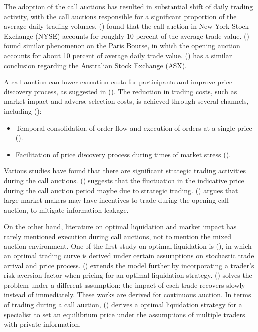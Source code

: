\documentclass{article}
\begin{document}
The adoption of the call auctions has resulted in substantial shift of daily trading activity, with the call auctions responsible for a significant proportion of the average daily trading volumes. (\cite{Madhavan2015}) found that the call auction in New York Stock Exchange (NYSE) accounts for roughly 10 percent of the average trade value. (\cite{Bruno1999}) found similar phenomenon on the Paris Bourse, in which the opening auction accounts for about 10 percent of average daily trade value. (\cite{Carole2006}) has a similar conclusion regarding the Australian Stock Exchange (ASX).

A call auction can lower execution costs for participants and improve price discovery process, as suggested in (\cite{Pagano2003}). The reduction in trading costs, such as market impact and adverse selection costs, is achieved through several channels, including (\cite{Carole2006}):

\begin{itemize}
  \item Temporal consolidation of order flow and execution of orders at a single price (\cite{Economides1995}).
  \item Facilitation of price discovery process during times of market stress (\cite{Madhavan1992}).
\end{itemize}

Various studies have found that there are significant strategic trading activities during the call auctions. (\cite{Bruno1999}) suggests that the fluctuation in the indicative price during the call auction period maybe due to strategic trading. (\cite{Vives2001}) argues that large market makers may have incentives to trade during the opening call auction, to mitigate information leakage.

On the other hand, literature on optimal liquidation and market impact has rarely mentioned execution during call auctions, not to mention the mixed auction environment. One of the first study on optimal liquidation is (\cite{HoStoll1981}), in which an optimal trading curve is derived under certain assumptions on stochastic trade arrival and price process. (\cite{AlmgrenChriss2000}) extends the model further by incorporating a trader's risk aversion factor when pricing for an optimal liquidation strategy. (\cite{Obizhaeva2013}) solves the problem under a different assumption: the impact of each trade recovers slowly instead of immediately. These works are derived for continuous auction. In terms of trading during a call auction, (\cite{Madhavan2015}) derives a optimal liquidation strategy for a specialist to set an equilibrium price under the assumptions of multiple traders with private information.
\end{document}
